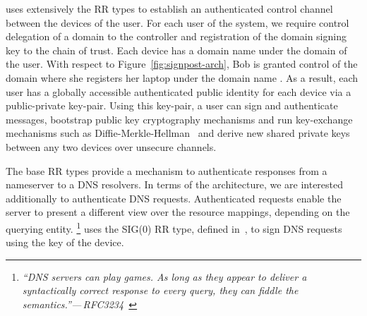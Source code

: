 \signpost uses extensively the \dnssec RR types to establish an authenticated
control channel between the devices of the user. For each user of the \signpost
system, we require control delegation of a domain to the \signpost controller
and registration of the domain signing key to the \dnssec chain of trust. Each
device has a domain name under the domain  of the user. With respect to
Figure~\ref{fig:signpost-arch}, Bob is granted control of the domain 
where she registers her laptop under the domain name . As a
result, each \signpost user has a globally accessible authenticated public
identity for each device via a public-private key-pair. Using this key-pair, a
user can sign and authenticate messages, bootstrap public key cryptography
mechanisms and run key-exchange mechanisms such as
Diffie-Merkle-Hellman~\cite{RFC2631} and derive new shared private keys between
any two devices over unsecure channels.

The base \dnssec RR types  provide a mechanism to authenticate responses from a
nameserver to a DNS resolvers. In terms of the \signpost architecture, we are
interested additionally to authenticate DNS requests. Authenticated requests
enable the server to present a different view over the resource mappings,
depending on the querying entity.  \footnote{{\em ``DNS servers can play games.
    As long as they appear to deliver a syntactically correct response to every
    query, they can fiddle the semantics.''---\,RFC3234~\cite{RFC3234}}}
\signpost uses the SIG(0) RR type, defined in~\cite{RFC2931}, to sign DNS
requests using the key of the device.  


